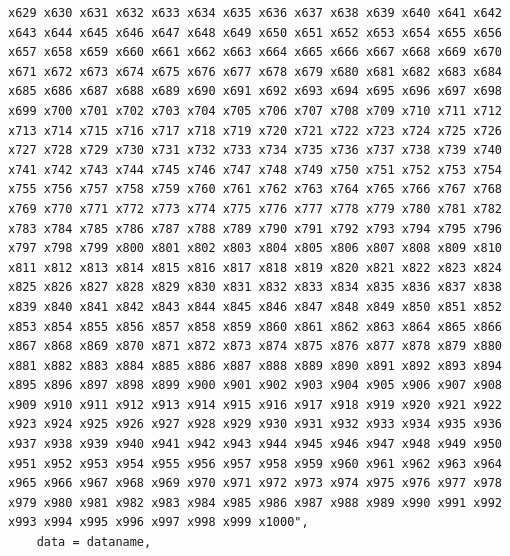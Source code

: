 \documentclass{article}
\begin{document}
\begin{lstlisting}
x629 x630 x631 x632 x633 x634 x635 x636 x637 x638 x639 x640 x641 x642 x643 x644 x645 x646 x647 x648 x649 x650 x651 x652 x653 x654 x655 x656 x657 x658 x659 x660 x661 x662 x663 x664 x665 x666 x667 x668 x669 x670 x671 x672 x673 x674 x675 x676 x677 x678 x679 x680 x681 x682 x683 x684 x685 x686 x687 x688 x689 x690 x691 x692 x693 x694 x695 x696 x697 x698 x699 x700 x701 x702 x703 x704 x705 x706 x707 x708 x709 x710 x711 x712 x713 x714 x715 x716 x717 x718 x719 x720 x721 x722 x723 x724 x725 x726 x727 x728 x729 x730 x731 x732 x733 x734 x735 x736 x737 x738 x739 x740 x741 x742 x743 x744 x745 x746 x747 x748 x749 x750 x751 x752 x753 x754 x755 x756 x757 x758 x759 x760 x761 x762 x763 x764 x765 x766 x767 x768 x769 x770 x771 x772 x773 x774 x775 x776 x777 x778 x779 x780 x781 x782 x783 x784 x785 x786 x787 x788 x789 x790 x791 x792 x793 x794 x795 x796 x797 x798 x799 x800 x801 x802 x803 x804 x805 x806 x807 x808 x809 x810 x811 x812 x813 x814 x815 x816 x817 x818 x819 x820 x821 x822 x823 x824 x825 x826 x827 x828 x829 x830 x831 x832 x833 x834 x835 x836 x837 x838 x839 x840 x841 x842 x843 x844 x845 x846 x847 x848 x849 x850 x851 x852 x853 x854 x855 x856 x857 x858 x859 x860 x861 x862 x863 x864 x865 x866 x867 x868 x869 x870 x871 x872 x873 x874 x875 x876 x877 x878 x879 x880 x881 x882 x883 x884 x885 x886 x887 x888 x889 x890 x891 x892 x893 x894 x895 x896 x897 x898 x899 x900 x901 x902 x903 x904 x905 x906 x907 x908 x909 x910 x911 x912 x913 x914 x915 x916 x917 x918 x919 x920 x921 x922 x923 x924 x925 x926 x927 x928 x929 x930 x931 x932 x933 x934 x935 x936 x937 x938 x939 x940 x941 x942 x943 x944 x945 x946 x947 x948 x949 x950 x951 x952 x953 x954 x955 x956 x957 x958 x959 x960 x961 x962 x963 x964 x965 x966 x967 x968 x969 x970 x971 x972 x973 x974 x975 x976 x977 x978 x979 x980 x981 x982 x983 x984 x985 x986 x987 x988 x989 x990 x991 x992 x993 x994 x995 x996 x997 x998 x999 x1000",
    data = dataname,

\end{lstlisting}
\end{document}
